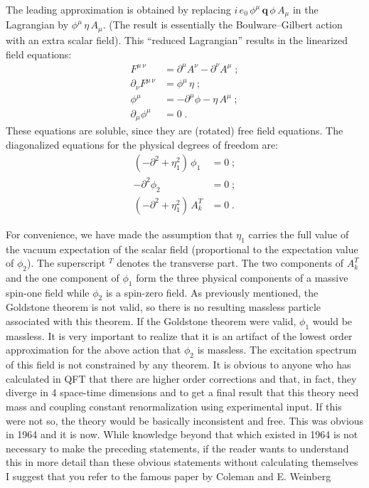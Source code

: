 \documentclass[preprintnumbers,12pt]{revtex4-2}
\begin{document}
The leading approximation is obtained by replacing $i\, e_0\,
\phi^{\mu}\, \mathbf{q}\, \phi\, A_{\mu}$ in the Lagrangian by
$\phi^{\mu}\, \eta\, A_{\mu}$. (The result is essentially the
Boulware--Gilbert action with an extra scalar field). This ``reduced
Lagrangian'' results in the linearized field equations:
\begin{align*}
  F^{\mu\, \nu} &= \partial^{\mu} A^{\nu} - \partial^{\nu} A^{\mu} \; ;\\
  \partial_{\nu} F^{\mu\, \nu} &= \phi^{\mu}\, \eta\; ; \\
  \phi^{\mu} &= -\partial^{\mu}\phi - \eta\, A^{\mu} \; ; \\
  \partial_{\mu}\phi^{\mu} &= 0\; .
\end{align*}
These equations are soluble, since they are (rotated) free field
equations. The diagonalized equations for the physical degrees of freedom
are:
\begin{align*}
  (-\partial^2 + \eta_1^2)\, \phi_1 &= 0 \; ;\\
  -\partial^2 \phi_2 &= 0 \; ;\\
  (-\partial^2 + \eta_1^2)\, A_k^T &= 0 \; .
\end{align*}

For convenience, we have made the assumption that $\eta_1$ carries the
full value of the vacuum expectation of the scalar field (proportional
to the expectation value of $\phi_2$).  The superscript ${}^T$ denotes
the transverse part.  The two components of $A_k^T$ and the one
component of $\phi_1$ form the three physical components of a massive
spin-one field while $\phi_2$ is a spin-zero field. As previously
mentioned, the Goldstone theorem is not valid, so there is no
resulting massless particle associated with this theorem. If the
Goldstone theorem were valid, $\phi_1$ would be massless. It is very
important to realize that it is an artifact of the lowest order
approximation for the above action that $\phi_2$ is massless. The
excitation spectrum of this field is not constrained by any
theorem. It is obvious to anyone who has calculated in QFT that there
are higher order corrections and that, in fact, they diverge in 4
space-time dimensions and to get a final result that this theory need
mass and coupling constant renormalization using experimental
input. If this were not so, the theory would be basically inconsistent
and free. This was obvious in 1964 and it is now. While knowledge
beyond that which existed in 1964 is not necessary to make the
preceding statements, if the reader wants to understand this in more
detail than these obvious statements without calculating themselves I
suggest that you refer to the famous paper by Coleman and E. Weinberg
\cite{cw;1972}
\end{document}
